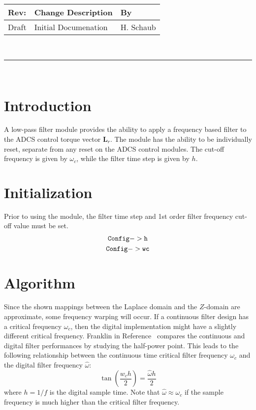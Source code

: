 \documentclass[]{AVSSimReportMemo}
\begin{document}
\makeCover


%
%
\pagestyle{empty}
{\renewcommand{\arraystretch}{2}
\noindent
\begin{longtable}{|p{0.5in}|p{4.5in}|p{1.14in}|}
\hline
{\bfseries Rev}: & {\bfseries Change Description} & {\bfseries By} \\
\hline
Draft & Initial Documenation & H. Schaub \\
\hline

\end{longtable}
}

\newpage
\setcounter{page}{1}
\pagestyle{fancy}

\tableofcontents
~\\ \hrule ~\\

\section{Introduction}
A low-pass filter module provides the ability to apply a frequency based filter to the ADCS control torque vector $\bm L_{r}$.  The module has the ability to be individually reset, separate from any reset on the ADCS control modules.  The cut-off frequency is given by $\omega_{c}$, while the filter time step is given by $h$.  

\section{Initialization}
Prior to using the module, the filter time step and 1st order filter frequency cut-off value must be set.
\begin{gather*}
{\tt Config->h} \\
 {\tt Config->wc} 
\end{gather*}

\section{Algorithm}
Since the shown mappings between the Laplace domain and the $Z$-domain 
are approximate, some frequency warping will occur.  If a continuous 
filter design has a critical frequency $\omega_{c}$, then the digital 
implementation might have a slightly different critical frequency.  
Franklin in Reference~ compares the continuous and 
digital filter performances by studying the half-power point.  This 
leads to the following relationship between the continuous time 
critical filter frequency $\omega_{c}$ and the digital filter 
frequency $\hat\omega$:
\begin{equation}
	\label{eq:wa}
	\tan \left(\frac{ w_{c} h}{2}\right) = \frac{\hat\omega h}{2}
\end{equation}
where $h=1/f$ is the digital sample time.  Note that $\hat\omega \approx 
\omega_{c}$ if the sample frequency is much higher than the critical 
filter frequency. 
\end{document}
